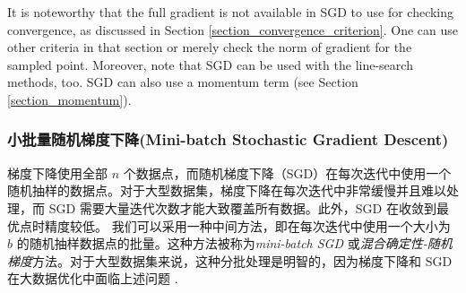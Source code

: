 \documentclass[lang=cn,10pt]{gorgeousnbook}
\numberwithin{equation}{section}%
\numberwithin{figure}{section}%
\begin{document}
It is noteworthy that the full gradient is not available in SGD to use for checking convergence, as discussed in Section \ref{section_convergence_criterion}. One can use other criteria in that section or merely check the norm of gradient for the sampled point. 
Moreover, note that SGD can be used with the line-search methods, too. 
SGD can also use a momentum term (see Section \ref{section_momentum}).

\subsubsection{小批量随机梯度下降(Mini-batch Stochastic Gradient Descent)}

梯度下降使用全部 $n$ 个数据点，而随机梯度下降（SGD）在每次迭代中使用一个随机抽样的数据点。对于大型数据集，梯度下降在每次迭代中非常缓慢并且难以处理，而 SGD 需要大量迭代次数才能大致覆盖所有数据。此外，SGD 在收敛到最优点时精度较低。
我们可以采用一种中间方法，即在每次迭代中使用一个大小为 $b$ 的随机抽样数据点的批量。这种方法被称为\textit{mini-batch SGD} 或\textit{混合确定性-随机梯度}方法。对于大型数据集来说，这种分批处理是明智的，因为梯度下降和 SGD 在大数据优化中面临上述问题 \cite{bottou2018optimization}.
\end{document}
